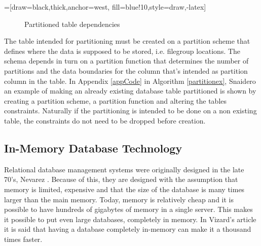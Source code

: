 \documentclass{cslthse-msc}
\begin{document}
=[draw=black,thick,anchor=west, fill=blue!10,style={draw,-latex}]
\begin{figure}[H]
\begin{center}
\end{center}
\caption {Partitioned table dependencies}
\label{partdep}
\end{figure}
\noindent The table intended for partitioning must be created on a partition scheme that defines where the data is supposed to be stored, i.e. filegroup locations. The schema depends in turn on a partition function that determines the number of partitions and the data boundaries for the column that's intended as partition column in the table.
In Appendix \ref{appCode} in Algorithm \ref{partitionex}, Snaidero \cite{partitonexample} an example of making an already existing database table partitioned is shown by creating a partition scheme, a partition function and altering the tables constraints. Naturally if the partitioning is intended to be done on a non existing table, the constraints do not need to be dropped before creation. 
 
\subsection{In-Memory Database Technology}
Relational database management systems were originally designed in the late 70's, Nevarez \cite{Nevarez}. Because of this, they are designed with the assumption that memory is limited, expensive and that the size of the database is many times larger than the main memory. Today, memory is relatively cheap and it is possible to have hundreds of gigabytes of memory in a single server. This makes it possible to put even large databases, completely in memory. In Vizard's article   \cite{Vizard12} it is said that having a database completely in-memory can make it a thousand times faster.
\end{document}
